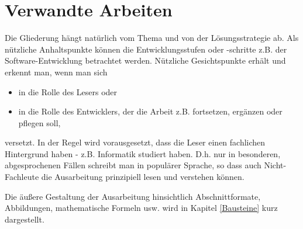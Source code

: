 \chapter{Verwandte Arbeiten}

Die Gliederung hängt natürlich vom Thema und von der Lösungsstrategie ab. Als nützliche Anhaltspunkte können die Entwicklungsstufen oder -schritte z.B. der Software-Entwicklung betrachtet werden. Nützliche Gesichtspunkte erhält und erkennt man, wenn man sich

\begin{itemize}
	\item in die Rolle des Lesers oder
	\item in die Rolle des Entwicklers, der die Arbeit z.B. fortsetzen, ergänzen oder pflegen soll,
\end{itemize}

versetzt. In der Regel wird vorausgesetzt, dass die Leser einen fachlichen Hintergrund haben - z.B. Informatik studiert haben. D.h. nur in besonderen, abgesprochenen Fällen schreibt man in populärer Sprache, so dass auch Nicht-Fachleute die Ausarbeitung prinzipiell lesen und verstehen können.

Die äußere Gestaltung der Ausarbeitung hinsichtlich Abschnittformate, Abbildungen, mathematische Formeln usw. wird in Kapitel \ref{Bausteine} kurz dargestellt.
